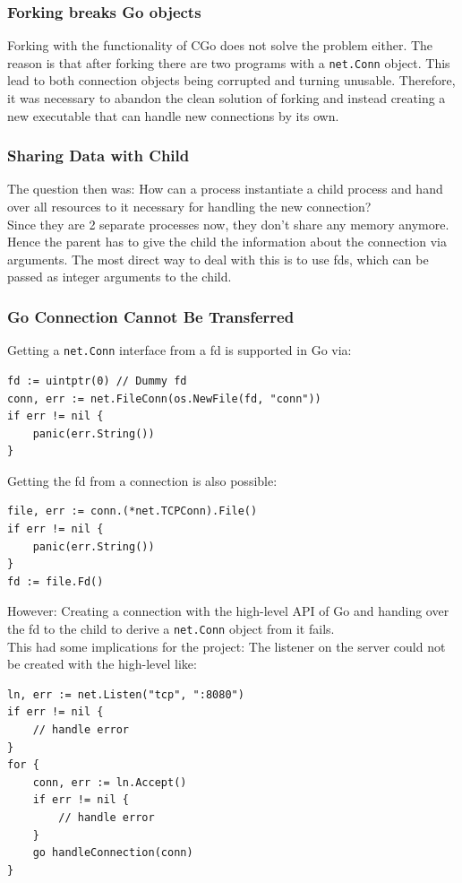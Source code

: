 \documentclass[10pt,a4paper,titlepage,twoside,english,final]{zhawreprt}
\begin{document}
\subsubsection{Forking breaks Go objects}\label{sssec:ForkingBreaksGoObjects}
Forking with the functionality of \gls{CGo} does not solve the problem either. The reason is that after forking there are two programs with a \texttt{net.Conn} object. This lead to both connection objects being corrupted and turning unusable. Therefore, it was necessary to abandon the clean solution of forking and instead creating a new executable that can handle new connections by its own.

\subsubsection{Sharing Data with Child}\label{sssec:SharingDataWithChild}
The question then was: How can a process instantiate a child process and hand over all resources to it necessary for handling the new connection?\\
Since they are 2 separate processes now, they don't share any memory anymore. Hence the parent has to give the child the information about the connection via arguments. The most direct way to deal with this is to use \glspl{fd}, which can be passed as integer arguments to the child.

\subsubsection{Go Connection Cannot Be Transferred}\label{sssec:GoConnectionCannotBeTransferred}
Getting a \texttt{net.Conn} interface from a \gls{fd} is supported in \gls{Go} via:
\setlistingGo
\begin{lstlisting}[caption={Getting a \texttt{net.Conn} interface from a \gls{fd}},label=lst:ConnFromFD]
fd := uintptr(0) // Dummy fd
conn, err := net.FileConn(os.NewFile(fd, "conn"))
if err != nil {
	panic(err.String())
}
\end{lstlisting}

Getting the \gls{fd} from a connection is also possible:
\setlistingGo
\begin{lstlisting}[caption={Getting the \gls{fd} from a \texttt{net.Conn} object},label=lst:FDFromConn]
file, err := conn.(*net.TCPConn).File()
if err != nil {
	panic(err.String())
}
fd := file.Fd()
\end{lstlisting}

However: Creating a connection with the high-level \gls{API} of \gls{Go} and handing over the \gls{fd} to the child to derive a \texttt{net.Conn} object from it fails.\\
This had some implications for the project: The listener on the server could not be created with the high-level like:
\setlistingGo
\begin{lstlisting}[caption={\gls{Go}s high level \gls{API} for listener},label=lst:ListenForConn]
ln, err := net.Listen("tcp", ":8080")
if err != nil {
	// handle error
}
for {
	conn, err := ln.Accept()
	if err != nil {
		// handle error
	}
	go handleConnection(conn)
}
\end{lstlisting}
\end{document}
